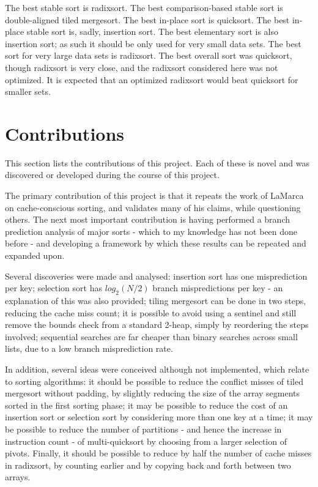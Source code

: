 The best stable sort is radixsort. The best comparison-based stable sort is
double-aligned tiled mergesort. The best in-place sort is quicksort. The best in-place
stable sort is, sadly, insertion sort. The best elementary sort is also
insertion sort; as such it should be only used for very small data sets.  The
best sort for very large data sets is radixsort. The best overall sort was
quicksort, though radixsort is very close, and the radixsort considered here was
not optimized. It is expected that an optimized radixsort would beat quicksort
for smaller sets.

\section{Contributions}

This section lists the contributions of this project. Each of these is novel  
and was discovered or developed during the course of this project.

The primary contribution of this project is that it repeats the work of LaMarca
on cache-conscious sorting, and validates many of his claims, while questioning
others. The next most important contribution is having performed a branch
prediction analysis of major sorts - which to my knowledge has not been done
before - and developing a framework by which these results can be repeated and
expanded upon.


Several discoveries were made and analysed: insertion sort has one misprediction
per key; selection sort has $log_2(N/2)$ branch mispredictions per key - an
explanation of this was also provided; tiling mergesort can be done in two
steps, reducing the cache miss count; it is possible to avoid using a
sentinel and still remove the bounds check from a standard 2-heap, simply by
reordering the steps involved; sequential searches are far cheaper than binary
searches across small lists, due to a low branch misprediction rate.



In addition, several ideas were conceived although not implemented, which relate
to sorting algorithms: it should be possible to reduce the conflict misses of
tiled mergesort without padding, by slightly reducing the size of the array
segments sorted in the first sorting phase; it may be possible to reduce the
cost of an insertion sort or selection sort by considering more than one key at
a time; it may be possible to reduce the number of partitions - and hence the
increase in instruction count - of multi-quicksort by choosing from a larger
selection of pivots. Finally, it should be possible to reduce by half the number
of cache misses in radixsort, by counting earlier and by copying back and forth
between two arrays.
